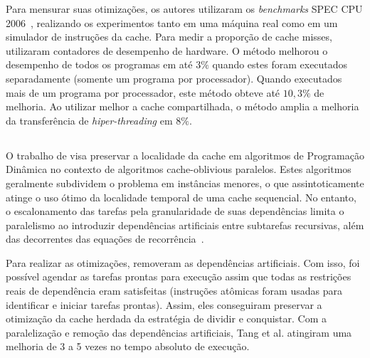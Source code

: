 Para mensurar suas otimizações, os autores utilizaram os \textit{benchmarks} SPEC CPU 2006~\cite{spec2006}, realizando os experimentos tanto em uma máquina real como em um simulador de instruções da cache. Para medir a proporção de cache misses, utilizaram contadores de desempenho de hardware.
O método melhorou o desempenho de todos os programas em até $3\%$ quando estes foram executados separadamente (somente um programa por processador).
Quando executados mais de um programa por processador, este método obteve até $10,3\%$ de melhoria. Ao utilizar melhor a cache compartilhada, o método amplia a melhoria da transferência de \textit{hiper-threading} em $8\%$.

\subsection{}

O trabalho de  visa preservar a localidade da cache em algoritmos de Programação Dinâmica no contexto de algoritmos cache-oblivious paralelos.
Estes algoritmos geralmente subdividem o problema em instâncias menores, o que assintoticamente atinge o uso ótimo da localidade temporal de uma cache sequencial.
No entanto, o escalonamento das tarefas pela granularidade de suas dependências limita o paralelismo ao introduzir dependências artificiais entre subtarefas recursivas, além das decorrentes das equações de recorrência~\cite{Tang2015}.

Para realizar as otimizações,  removeram as dependências artificiais. Com isso, foi possível agendar as tarefas prontas para execução assim que todas as restrições reais de dependência eram satisfeitas (instruções atômicas foram usadas para identificar e iniciar tarefas prontas). Assim, eles conseguiram preservar a otimização da cache herdada da estratégia de dividir e conquistar.
Com a paralelização e remoção das dependências artificiais, Tang et al. atingiram uma melhoria de 3 a 5 vezes no tempo absoluto de execução.

\subsection{}


